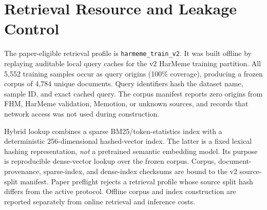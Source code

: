 \section{Retrieval Resource and Leakage Control}
\label{sec:supp:retrieval}

The paper-eligible retrieval profile is
\texttt{harmeme\_train\_v2}.  It was built offline by replaying auditable
local query caches for the v2 HarMeme training partition.  All 5,552 training
samples occur as query origins (100\% coverage), producing a frozen corpus of
4,784 unique documents.  Query identifiers hash the dataset name, sample ID,
and exact cached query.  The corpus manifest reports zero origins from FHM,
HarMeme validation, Memotion, or unknown sources, and records that network
access was not used during construction.

Hybrid lookup combines a sparse BM25/token-statistics index with a
deterministic 256-dimensional hashed-vector index.  The latter is a fixed
lexical hashing representation, \emph{not} a pretrained semantic embedding
model.  Its purpose is reproducible dense-vector lookup over the frozen
corpus.  Corpus, document-provenance, sparse-index, and dense-index checksums
are bound to the v2 source-split manifest.  Paper preflight rejects a
retrieval profile whose source split hash differs from the active protocol.
Offline corpus and index construction are reported separately from online
retrieval and inference costs.
